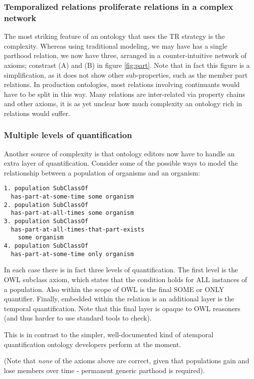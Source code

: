 \documentclass{bioinfo}
\begin{document}
\subsubsection{Temporalized relations proliferate relations in a complex network}

The most striking feature of an ontology that uses the TR strategy is
the complexity. Whereas using traditional modeling, we may have has a
single parthood relation, we now have three, arranged in a
counter-intuitive network of axioms; constrast (A) and (B) in figure
\ref{fig:part}. Note that in fact this figure is a simplification, as
it does not show other sub-properties, such as the member part
relations. In production ontologies, most relations involving
continuants would have to be split in this way. Many relations are
inter-related via property chains and other axioms, it is as yet
unclear how much complexity an ontology rich in relations would
suffer.

\subsubsection{Multiple levels of quantification}

Another source of complexity is that ontology editors now have to
handle an extra layer of quantification. Consider some of the possible
ways to model the relationship between a population of organisms and
an organism:

\begin{verbatim}
1. population SubClassOf 
  has-part-at-some-time some organism
2. population SubClassOf 
  has-part-at-all-times some organism
3. population SubClassOf 
  has-part-at-all-times-that-part-exists
    some organism
4. population SubClassOf 
  has-part-at-some-time only organism
\end{verbatim}

In each case there is in fact three levels of quantification. The
first level is the OWL subclass axiom, which states that the condition
holds for ALL instances of a population. Also within the scope of OWL
is the final SOME or ONLY quantifier. Finally, embedded within the
relation is an additional layer is the temporal quantification. Note
that this final layer is opaque to OWL reasoners (and thus harder to
use standard tools to check).

This is in contrast to the simpler, well-documented kind of atemporal
quantification ontology developers perform at the moment.

(Note that \emph{none} of the axioms above are correct, given that
populations gain and lose members over time - permanent generic
parthood is required).
\end{document}
